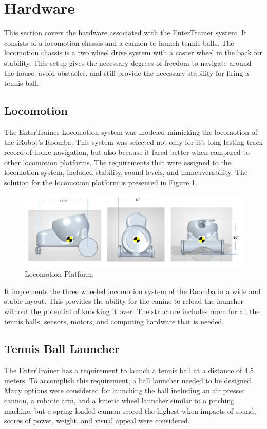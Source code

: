 \documentclass[11pt]{article}
\begin{document}
\section{Hardware}
This section covers the hardware associated with the EnterTrainer system. It consists of a locomotion chassis and a cannon to launch tennis balls. The locomotion chassis is a two wheel drive system with a caster wheel in the back for stability. This setup gives the necessary degrees of freedom to navigate around the house, avoid obstacles, and still provide the necessary stability for firing a tennis ball. 
\subsection{Locomotion}
The EnterTrainer Locomotion system was modeled mimicking the locomotion of the iRobot's Roomba. This system was selected not only for it's long lasting track record of home navigation, but also because it fared better when compared to other locomotion platforms.
The requirements that were assigned to the locomotion system, included stability, sound levels, and maneuverability.
The solution for the locomotion platform is presented in Figure \ref{Locomotion}.

\begin{figure}[H]
    \centering
        \includegraphics[scale=0.6, angle =0]{figures/Center of mass.PNG}
    \caption{Locomotion Platform.}
    \label{Locomotion}
\end{figure}

It implements the three wheeled locomotion system of the Roomba in a wide and stable layout. This provides the ability for the canine to reload the launcher without the potential of knocking it over. The structure includes room for all the tennis balls, sensors, motors, and computing hardware that is needed. 

\subsection{Tennis Ball Launcher}
The EnterTrainer has a requirement to launch a tennis ball at a distance of 4.5 meters. To accomplish this requirement, a ball launcher needed to be designed. Many options were considered for launching the ball including an air presser cannon, a robotic arm, and a kinetic wheel launcher similar to a pitching machine, but a spring loaded cannon scored the highest when impacts of sound, scores of power, weight, and visual appeal were considered.
\end{document}
